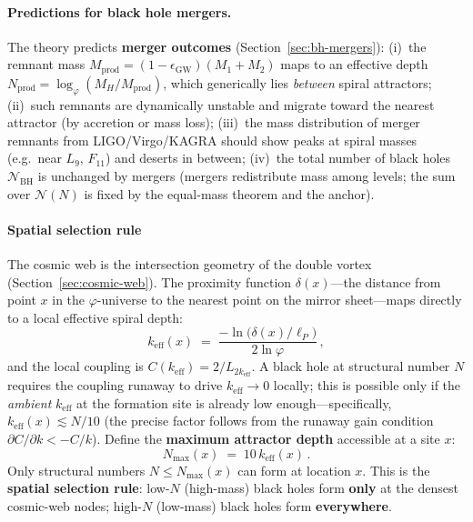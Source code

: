 \documentclass[12pt,a4paper]{article}
\begin{document}
\paragraph{Predictions for black hole mergers.}
The theory predicts \textbf{merger outcomes} (Section~\ref{sec:bh-mergers}): (i)~the remnant mass $M_{\mathrm{prod}} = (1-\epsilon_{\mathrm{GW}})(M_1+M_2)$ maps to an effective depth $N_{\mathrm{prod}} = \log_\varphi(M_H/M_{\mathrm{prod}})$, which generically lies \emph{between} spiral attractors; (ii)~such remnants are dynamically unstable and migrate toward the nearest attractor (by accretion or mass loss); (iii)~the mass distribution of merger remnants from LIGO/Virgo/KAGRA should show peaks at spiral masses (e.g.\ near $L_9$, $F_{11}$) and deserts in between; (iv)~the total number of black holes $\mathcal{N}_{\mathrm{BH}}$ is unchanged by mergers (mergers redistribute mass among levels; the sum over $\mathcal{N}(N)$ is fixed by the equal-mass theorem and the anchor).

\paragraph{Spatial selection rule}
\label{sec:bh-spatial-rule}

The cosmic web is the intersection geometry of the double vortex (Section~\ref{sec:cosmic-web}).  The proximity function $\delta(x)$---the distance from point $x$ in the $\varphi$-universe to the nearest point on the mirror sheet---maps directly to a local effective spiral depth:
\begin{equation}
\label{eq:keff-delta}
k_{\mathrm{eff}}(x) \;=\; \frac{-\ln\bigl(\delta(x)/\ell_P\bigr)}{2\ln\varphi}\,,
\end{equation}
and the local coupling is $C(k_{\mathrm{eff}}) = 2/L_{2k_{\mathrm{eff}}}$.  A black hole at structural number $N$ requires the coupling runaway to drive $k_{\mathrm{eff}} \to 0$ locally; this is possible only if the \emph{ambient} $k_{\mathrm{eff}}$ at the formation site is already low enough---specifically, $k_{\mathrm{eff}}(x) \lesssim N/10$ (the precise factor follows from the runaway gain condition $\partial C/\partial k < -C/k$).  Define the \textbf{maximum attractor depth} accessible at a site $x$:
\begin{equation}
\label{eq:nmax}
\boxed{N_{\max}(x) \;=\; 10\,k_{\mathrm{eff}}(x)\,.}
\end{equation}
Only structural numbers $N \leq N_{\max}(x)$ can form at location $x$.  This is the \textbf{spatial selection rule}: low-$N$ (high-mass) black holes form \textbf{only} at the densest cosmic-web nodes; high-$N$ (low-mass) black holes form \textbf{everywhere}.
\end{document}
